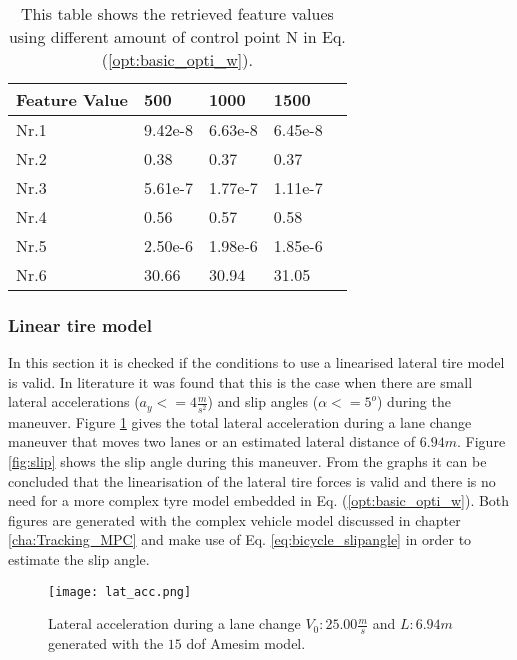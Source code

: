 \begin{table}[h!]
	\centering
	\begin{tabular}{@{}llllr@{}} \toprule
		\textbf{Feature Value}    & 500   & 1000       & 1500 \\ \midrule
		Nr.1       & 9.42e-8     & 6.63e-8   & 6.45e-8\\
		Nr.2       & 0.38        & 0.37      & 0.37\\
		Nr.3       & 5.61e-7     & 1.77e-7   & 1.11e-7 \\
		Nr.4       & 0.56        & 0.57      & 0.58\\
		Nr.5       & 2.50e-6     & 1.98e-6   & 1.85e-6\\
		Nr.6       & 30.66       & 30.94     & 31.05\\ \bottomrule
	\end{tabular}
	\caption{This table shows the retrieved feature values using different amount of control point N in Eq. (\ref{opt:basic_opti_w}).}
	\label{tab:GD_N}
\end{table}


\subsubsection{Linear tire model}
In this section it is checked if the conditions to use a linearised lateral tire model is valid. In literature \cite{TongDuySon2019} it was found that this is the case when there are small lateral accelerations ($a_y <= 4 \frac{m}{s^2}$) and slip angles ($\alpha <= 5^o $) during the maneuver. Figure \ref{fig:lat} gives the total lateral acceleration during a lane change maneuver that moves two lanes or an estimated lateral distance of $6.94 m$. Figure \ref{fig:slip} shows the slip angle during this maneuver. From the graphs it can be concluded that the linearisation of the lateral tire forces is valid and there is no need for a more complex tyre model embedded in Eq. (\ref{opt:basic_opti_w}).  Both figures are generated with the complex vehicle model discussed in chapter \ref{cha:Tracking_MPC} and make use of Eq. \ref{eq:bicycle_slipangle} in order to estimate the slip angle.

 \begin{figure}[h!]
	\centering
	\texttt{[image: lat\_acc.png]}
	\caption{Lateral acceleration during a lane change $V_0: 25.00 \frac{m}{s}$ and $L:6.94 m$ generated with the $15$ dof Amesim model.}
	\label{fig:lat}
\end{figure}

